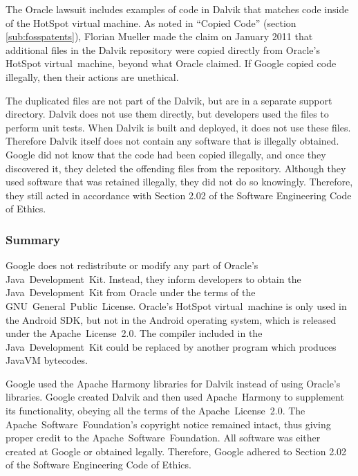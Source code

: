\documentclass[11pt]{article}
\begin{document}
\begin{multicols}{2}
The Oracle lawsuit includes examples of code in Dalvik that matches code inside
of the HotSpot virtual machine.  As noted in ``Copied Code'' (section
\ref{sub:fosspatents}), Florian Mueller made the claim on January 2011 that
additional files in the Dalvik repository were copied directly from Oracle's
HotSpot virtual~machine, beyond what Oracle claimed.  If Google copied code
illegally, then their actions are unethical.

The duplicated files are not part of the Dalvik, but are in a separate support
directory.  Dalvik does not use them directly, but developers used the files to
perform unit tests.  When Dalvik is built and deployed, it does not use these
files.  Therefore Dalvik itself does not contain any software that is illegally
obtained.  Google did not know that the code had been copied illegally, and once
they discovered it, they deleted the offending files from the repository.
Although they used software that was retained illegally, they did not do so
knowingly.  Therefore, they still acted in accordance with Section 2.02 of the
Software Engineering Code of Ethics.


\subsubsection{Summary} %
\label{ssub:licensing-summary}

Google does not redistribute or modify any part of Oracle's Java~Development~Kit.
Instead, they inform developers to obtain the Java~Development~Kit from Oracle
under the terms of the GNU~General~Public~License.  Oracle's HotSpot
virtual~machine is only used in the Android SDK, but not in the Android
operating system, which is released under the Apache~License~2.0.  The compiler
included in the Java~Development~Kit could be replaced by another program which
produces JavaVM bytecodes.

Google used the Apache Harmony libraries for Dalvik instead of using Oracle's
libraries.  Google created Dalvik and then used Apache~Harmony to supplement its
functionality, obeying all the terms of the Apache~License~2.0.  The
Apache~Software~Foundation's copyright notice remained intact, thus giving
proper credit to the Apache~Software~Foundation. All software was either created
at Google or obtained legally.  Therefore, Google adhered to Section 2.02 of the
Software Engineering Code of Ethics.



\end{multicols}
\end{document}
